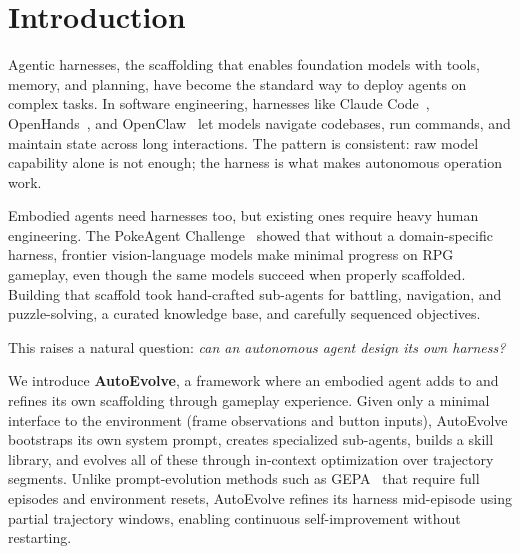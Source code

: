 \section{Introduction}\label{sec:introduction}

Agentic harnesses, the scaffolding that enables foundation models with tools, memory, and planning, have become the standard way to deploy agents on complex tasks. In software engineering, harnesses like Claude Code~\citep{anthropic2025claudecode}, OpenHands~\citep{wang2024openhands}, and OpenClaw~\citep{steinberger2025openclaw} let models navigate codebases, run commands, and maintain state across long interactions. The pattern is consistent: raw model capability alone is not enough; the harness is what makes autonomous operation work.

Embodied agents need harnesses too, but existing ones require heavy human engineering. The PokeAgent Challenge~\citep{karten2025pokeagent} showed that without a domain-specific harness, frontier vision-language models make minimal progress on RPG gameplay, even though the same models succeed when properly scaffolded. Building that scaffold took hand-crafted sub-agents for battling, navigation, and puzzle-solving, a curated knowledge base, and carefully sequenced objectives. 

This raises a natural question: \emph{can an autonomous agent design its own harness?}

We introduce \textbf{AutoEvolve}, a framework where an embodied agent adds to and refines its own scaffolding through gameplay experience. Given only a minimal interface to the environment (frame observations and button inputs), AutoEvolve bootstraps its own system prompt, creates specialized sub-agents, builds a skill library, and evolves all of these through in-context optimization over trajectory segments. Unlike prompt-evolution methods such as GEPA~\citep{agrawal2025gepa} that require full episodes and environment resets, AutoEvolve refines its harness mid-episode using partial trajectory windows, enabling continuous self-improvement without restarting.

